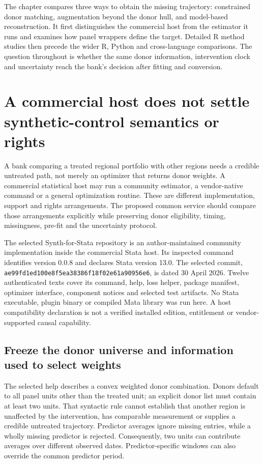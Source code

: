 The chapter compares three ways to obtain the missing trajectory: constrained
donor matching, augmentation beyond the donor hull, and model-based
reconstruction. It first distinguishes the commercial host from the estimator
it runs and examines how panel wrappers define the target. Detailed R method
studies then precede the wider R, Python and cross-language comparisons.
The question throughout is whether the same donor information, intervention
clock and uncertainty reach the bank's decision after fitting and conversion.

\section{A commercial host does not settle synthetic-control semantics or rights}
\label{exec19:synth-scope}

A bank comparing a treated regional portfolio with other regions needs a
credible untreated path, not merely an optimizer that returns donor weights.
A commercial statistical host may run a community estimator, a vendor-native
command or a general optimization routine. These are different implementation,
support and rights arrangements. The proposed common service should compare
those arrangements explicitly while preserving donor eligibility, timing,
missingness, pre-fit and the uncertainty protocol.

The selected Synth-for-Stata repository is an author-maintained community
implementation inside the commercial Stata host. Its inspected command identifies
version 0.0.8 and declares Stata version 13.0. The selected commit,
\texttt{ae99fd1ed100e8f5ea38386f18f02e61a90956e6}, is dated 30 April 2026.
Twelve authenticated texts cover its command, help, loss helper, package
manifest, optimizer interface, component notices and selected test artifacts.
No Stata executable, plugin binary or compiled Mata library was run here.
A host compatibility declaration is not a verified installed edition,
entitlement or vendor-supported causal capability.~\citep{exec19_synth_stata_source}

\subsection{Freeze the donor universe and information used to select weights}
\label{exec19:synth-donors}

The selected help describes a convex weighted donor combination. Donors default
to all panel units other than the treated unit; an explicit donor list must
contain at least two units. That syntactic rule cannot establish that another
region is unaffected by the intervention, has comparable measurement or supplies
a credible untreated trajectory. Predictor averages ignore missing entries,
while a wholly missing predictor is rejected. Consequently, two units can
contribute averages over different observed dates. Predictor-specific windows
can also override the common predictor period.~\citep{exec19_synth_stata_source}

